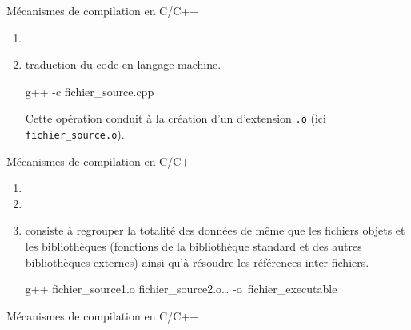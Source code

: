 \documentclass[c]{beamer}
\begin{document}
\begin{frame}[fragile]{Mécanismes de compilation en C/C++}
 \begin{enumerate}
\item {}
\item {} traduction du code en langage machine.
\begin{prompt}
g++ -c fichier\_source.cpp
\end{prompt}
Cette opération conduit à la création d'un  d'extension \texttt{.o}
(ici \texttt{fichier\_source.o}).
\end{enumerate}
\end{frame}

\begin{frame}[fragile]{Mécanismes de compilation en C/C++}
\begin{enumerate}
\item {}
\item {}
\item {} consiste à regrouper la totalité des données de même que
les fichiers objets et les bibliothèques (fonctions de la bibliothèque
standard et des autres bibliothèques externes) ainsi qu'à résoudre les
références inter-fichiers.
\begin{prompt}
g++ fichier\_source1.o fichier\_source2.o\ldots{} -o~fichier\_executable
\end{prompt}
\end{enumerate}
\end{frame}


\begin{frame}[fragile]{Mécanismes de compilation en C/C++}


\end{frame}
\end{document}
